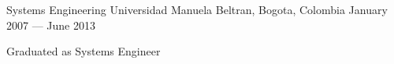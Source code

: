 

\begin{cventries}

  \cventry
    {Systems Engineering} %
    {Universidad Manuela Beltran,} %
    {Bogota, Colombia} %
    {January 2007 — June 2013} %
    {
      \begin{cvitems} %
        \item {Graduated as Systems Engineer}
      \end{cvitems}
    }

\end{cventries}
